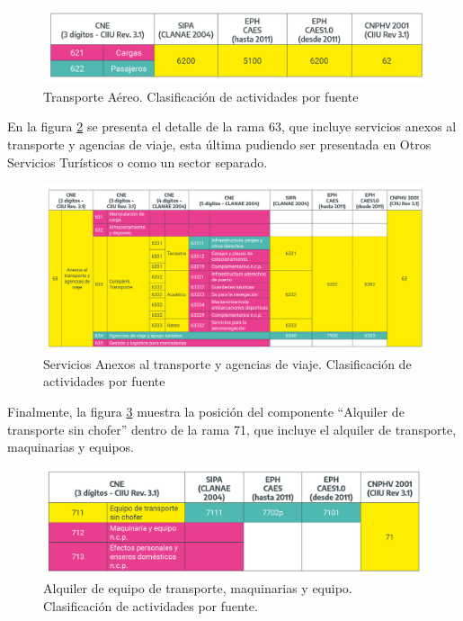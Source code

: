 \documentclass[
  openany]{book}
\begin{document}
\begin{figure}

{\centering \includegraphics[width=0.8\linewidth]{imagenes/figura3.8} 

}

\caption{Transporte Aéreo. Clasificación de actividades por fuente}\label{fig:empleofuentes8}
\end{figure}

En la figura \ref{fig:empleofuentes9} se presenta el detalle de la rama 63, que incluye servicios anexos al transporte y agencias de viaje, esta última pudiendo ser presentada en Otros Servicios Turísticos o como un sector separado.

\begin{figure}

{\centering \includegraphics[width=0.8\linewidth]{imagenes/figura3.9} 

}

\caption{Servicios Anexos al transporte y agencias de viaje. Clasificación de actividades por fuente}\label{fig:empleofuentes9}
\end{figure}

Finalmente, la figura \ref{fig:empleofuentes10} muestra la posición del componente ``Alquiler de transporte sin chofer'' dentro de la rama 71, que incluye el alquiler de transporte, maquinarias y equipos.

\begin{figure}

{\centering \includegraphics[width=0.8\linewidth]{imagenes/figura3.10} 

}

\caption{ Alquiler de equipo de transporte, maquinarias y equipo. Clasificación de actividades por fuente.}\label{fig:empleofuentes10}
\end{figure}
\end{document}
